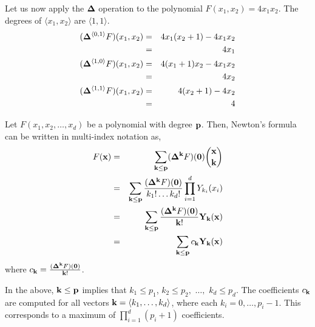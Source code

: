 \begin{Example}
Let us now apply the ${\bf \Delta}$ operation to the polynomial
$F(x_1, x_2) = 4x_1x_2$. The degrees of $\langle x_1, x_2 \rangle$ are
$\langle 1, 1\rangle$. 
\begin{eqnarray}
({\bf \Delta}^{\langle 0, 1\rangle}F)( x_1, x_2) &=& 4 x_1 (x_2 + 1) - 4 x_1 x_2  \nonumber \\
                                                 &=& 4 x_1 \nonumber \\
({\bf \Delta}^{\langle 1, 0\rangle}F)( x_1, x_2) &=& 4 (x_1 + 1) x_2 - 4 x_1 x_2  \nonumber \\
                                                 &=& 4 x_2 \nonumber \\
({\bf \Delta}^{\langle 1, 1\rangle}F)( x_1, x_2) &=& 4 (x_2 + 1) - 4 x_2  \nonumber \\
                                                 &=& 4 \nonumber 
\end{eqnarray}
\end{Example}

\begin{Proposition}\label{def:newt_multi}
Let $F(x_1, x_2, \ldots, x_d)$ be a polynomial with degree ${\bf
p}$. Then, Newton's formula can be written in multi-index notation as,
\begin{eqnarray}
F({\bf x}) &=& \sum_{{\bf k}\leq {\bf p}}({\bf \Delta}^{{\bf k}}F)({\bf
0}){{\bf x} \choose {\bf k}} \nonumber \\
           &=& \sum_{{\bf k}\leq {\bf p}}\frac{({\bf \Delta}^{{\bf
      k}}F)({\bf 0})}{k_1!\dots k_d!}\prod_{i=1}^{d}Y_{k_i}(x_i)\nonumber \\
           &=& \sum_{{\bf k}\leq {\bf p}}\frac{({\bf \Delta}^{{\bf
      k}}F)({\bf 0})}{\bf k!}{\bf Y}_{\bf k}({\bf x}) \nonumber \\
           &=& \sum_{{\bf k} \leq {\bf p}}c_{\bf k} {\bf Y}_{\bf k}({\bf x})
\end{eqnarray}
where $c_{\bf k} = \frac{({\bf \Delta}^{{\bf k}}F)({\bf 0})}{\bf k!}$. 
\end{Proposition} 

In the above, ${\bf k}\leq {\bf p}$ implies that $k_1 \leq p_1$, $k_2 \leq
p_2,$ $\ldots,$ $k_d \leq p_d$. The coefficients $c_{\bf k}$ are computed
for all vectors ${\bf k} = \langle k_1, \ldots, k_d \rangle$, where each $k_i =
0,\ldots, p_i-1$. This corresponds to a maximum of $\prod_{i=1}^d (p_i
+ 1) $ coefficients. 

